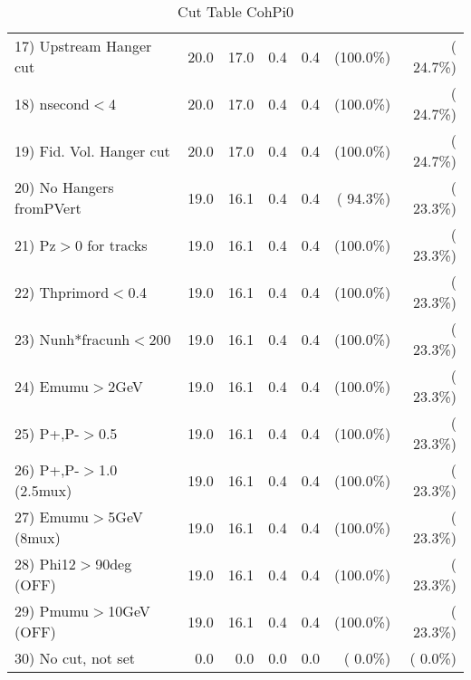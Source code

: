 \begin{table}[h!]
\begin{tabular}{||l||r|r|r|r|r|r||}
 17) Upstream Hanger cut  &         20.0 &         17.0 &          0.4 &          0.4 & (100.0\%) & ( 24.7\%) \\
 18) nsecond$<$4          &         20.0 &         17.0 &          0.4 &          0.4 & (100.0\%) & ( 24.7\%) \\
 19) Fid. Vol. Hanger cut &         20.0 &         17.0 &          0.4 &          0.4 & (100.0\%) & ( 24.7\%) \\
 20) No Hangers fromPVert &         19.0 &         16.1 &          0.4 &          0.4 & ( 94.3\%) & ( 23.3\%) \\
 21) Pz$>$0 for tracks    &         19.0 &         16.1 &          0.4 &          0.4 & (100.0\%) & ( 23.3\%) \\
 22) Thprimord$<$0.4      &         19.0 &         16.1 &          0.4 &          0.4 & (100.0\%) & ( 23.3\%) \\
 23) Nunh*fracunh$<$200   &         19.0 &         16.1 &          0.4 &          0.4 & (100.0\%) & ( 23.3\%) \\
 24) Emumu$>$2GeV         &         19.0 &         16.1 &          0.4 &          0.4 & (100.0\%) & ( 23.3\%) \\
 25) P+,P-$>$0.5          &         19.0 &         16.1 &          0.4 &          0.4 & (100.0\%) & ( 23.3\%) \\
 26) P+,P-$>$1.0 (2.5mux) &         19.0 &         16.1 &          0.4 &          0.4 & (100.0\%) & ( 23.3\%) \\
 27) Emumu$>$5GeV  (8mux) &         19.0 &         16.1 &          0.4 &          0.4 & (100.0\%) & ( 23.3\%) \\
 28) Phi12$>$90deg  (OFF) &         19.0 &         16.1 &          0.4 &          0.4 & (100.0\%) & ( 23.3\%) \\
 29) Pmumu$>$10GeV  (OFF) &         19.0 &         16.1 &          0.4 &          0.4 & (100.0\%) & ( 23.3\%) \\
 30) No cut, not set      &          0.0 &          0.0 &          0.0 &          0.0 & (  0.0\%) & (  0.0\%) \\
 \hline
 \hline
 \end{tabular}
 \caption{Cut Table  CohPi0   }
 \label{tab-cutheavy_neutrino_0.500}
 \end{table}
